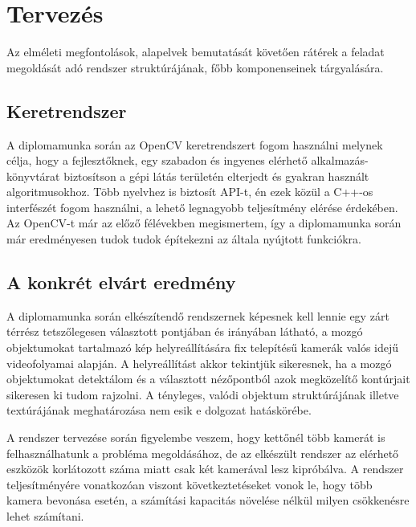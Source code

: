\chapter{Tervezés}

Az elméleti megfontolások, alapelvek bemutatását követően rátérek a feladat megoldását adó rendszer struktúrájának, főbb komponenseinek tárgyalására.

\section{Keretrendszer}

A diplomamunka során az OpenCV \cite{opencv} keretrendszert fogom használni melynek célja, hogy a fejlesztőknek, egy szabadon és ingyenes elérhető alkalmazás-könyvtárat biztosítson a gépi látás területén elterjedt és gyakran használt algoritmusokhoz. Több nyelvhez is biztosít API-t, én ezek közül a C++-os interfészét fogom használni, a lehető legnagyobb teljesítmény elérése érdekében. Az OpenCV-t már az előző félévekben megismertem, így a diplomamunka során már eredményesen tudok tudok építekezni az általa nyújtott funkciókra.

\section{A konkrét elvárt eredmény}

A diplomamunka során elkészítendő rendszernek képesnek kell lennie egy zárt térrész tetszőlegesen választott pontjában és irányában látható, a mozgó objektumokat tartalmazó kép helyreállítására fix telepítésű kamerák valós idejű videofolyamai alapján. A helyreállítást akkor tekintjük sikeresnek, ha a mozgó objektumokat detektálom és a választott nézőpontból azok megközelítő kontúrjait sikeresen ki tudom rajzolni. A tényleges, valódi objektum struktúrájának illetve textúrájának meghatározása nem esik e dolgozat hatáskörébe.

A rendszer tervezése során figyelembe veszem, hogy kettőnél több kamerát is felhasználhatunk a probléma megoldásához, de az elkészült rendszer az elérhető eszközök korlátozott száma miatt csak két kamerával lesz kipróbálva. A rendszer teljesítményére vonatkozóan viszont következtetéseket vonok le, hogy több kamera bevonása esetén, a számítási kapacitás növelése nélkül milyen csökkenésre lehet számítani.

